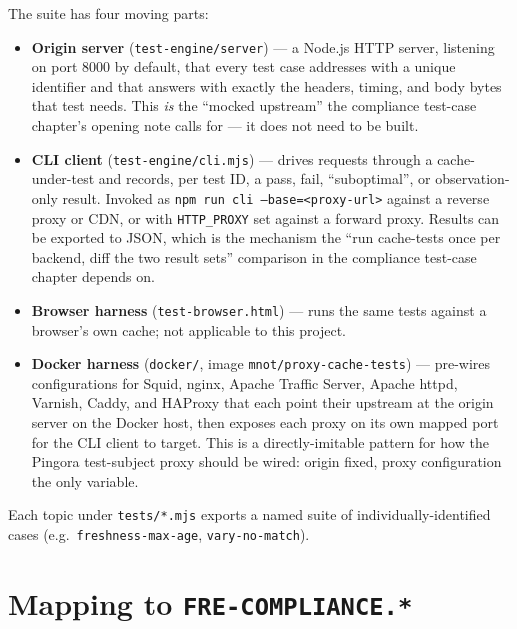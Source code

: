 The suite has four moving parts:

\begin{itemize}
    \item \textbf{Origin server} (\texttt{test-engine/server}) --- a Node.js
          HTTP server, listening on port 8000 by default, that every test
          case addresses with a unique identifier and that answers with
          exactly the headers, timing, and body bytes that test needs. This
          \emph{is} the ``mocked upstream'' the compliance test-case
          chapter's opening note calls for --- it does not need to be built.
    \item \textbf{CLI client} (\texttt{test-engine/cli.mjs}) --- drives
          requests through a cache-under-test and records, per test ID, a
          pass, fail, ``suboptimal'', or observation-only result. Invoked as
          \texttt{npm run cli --base=<proxy-url>} against a reverse proxy or
          CDN, or with \texttt{HTTP\_PROXY} set against a forward proxy.
          Results can be exported to JSON, which is the mechanism the ``run
          cache-tests once per backend, diff the two result sets''
          comparison in the compliance test-case chapter depends on.
    \item \textbf{Browser harness} (\texttt{test-browser.html}) --- runs the
          same tests against a browser's own cache; not applicable to this
          project.
    \item \textbf{Docker harness} (\texttt{docker/}, image
          \texttt{mnot/proxy-cache-tests}) --- pre-wires configurations for
          Squid, nginx, Apache Traffic Server, Apache httpd, Varnish, Caddy,
          and HAProxy that each point their upstream at the origin server on
          the Docker host, then exposes each proxy on its own mapped port for
          the CLI client to target. This is a directly-imitable pattern for
          how the Pingora test-subject proxy should be wired: origin fixed,
          proxy configuration the only variable.
\end{itemize}

Each topic under \texttt{tests/*.mjs} exports a named suite of
individually-identified cases (e.g.\ \texttt{freshness-max-age},
\texttt{vary-no-match}).

\section{Mapping to \texttt{FRE-COMPLIANCE.*}}
\begingroup
\sloppy
\expandafter\def\expandafter\UrlBreaks\expandafter{\UrlBreaks\do\-}
\label{app:cache-tests-mapping}

